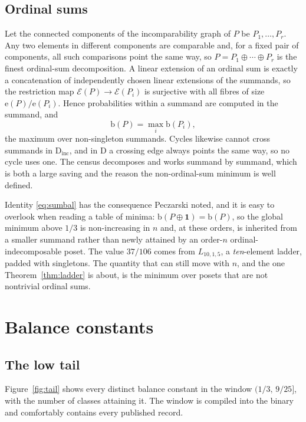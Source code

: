 \documentclass[11pt]{article}
\theoremstyle{definition}
\newcommand{\ext}{\mathrm{e}}
\newcommand{\bal}{\mathrm{b}}
\newcommand{\Dig}{\mathrm{D}}
\begin{document}
\subsection{Ordinal sums}

Let the connected components of the incomparability graph of $P$ be
$P_1,\ldots,P_r$.  Any two elements in different components are comparable
and, for a fixed pair of components, all such comparisons point the same way,
so $P=P_1\oplus\cdots\oplus P_r$ is the finest ordinal-sum decomposition.  A
linear extension of an ordinal sum is exactly a concatenation of independently
chosen linear extensions of the summands, so the restriction map
$\mathcal E(P)\to\mathcal E(P_i)$ is surjective with all fibres of size
$\ext(P)/\ext(P_i)$.  Hence probabilities within a summand are computed in the
summand, and
\begin{equation}\label{eq:sumbal}
  \bal(P)=\max_i\bal(P_i),
\end{equation}
the maximum over non-singleton summands.  Cycles likewise cannot cross
summands in $\Dig_{\mathrm{inc}}$, and in $\Dig$ a crossing edge always points
the same way, so no cycle uses one.  The census decomposes and works summand
by summand, which is both a large saving and the reason the non-ordinal-sum
minimum is well defined.

Identity \eqref{eq:sumbal} has the consequence Peczarski noted, and it is easy
to overlook when reading a table of minima: $\bal(P\oplus\mathbf 1)=\bal(P)$,
so the global minimum above $1/3$ is non-increasing in $n$ and, at these
orders, is inherited from a smaller summand rather than newly attained by an
order-$n$ ordinal-indecomposable poset.  The value $37/106$ comes from
$L_{10,1,5}$, a \emph{ten}-element ladder, padded with singletons.  The quantity
that can still move with $n$, and the one
Theorem~\ref{thm:ladder} is about, is the minimum over posets that are not
nontrivial ordinal sums.

\section{Balance constants}\label{sec:balance}

\subsection{The low tail}

Figure~\ref{fig:tail} shows every distinct balance constant in the window
$(1/3,\,9/25]$, with the number of classes attaining it.  The window is
compiled into the binary and comfortably contains every published record.
\end{document}
